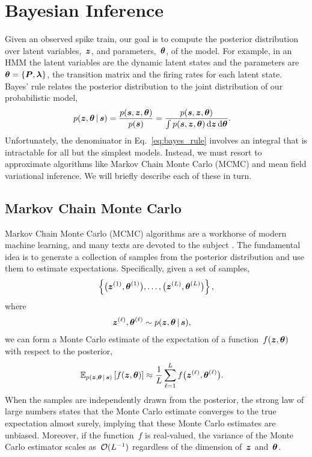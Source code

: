 
\section{Bayesian Inference}
\label{sec:inference_algorithms}
Given an observed spike train, our goal is to compute the posterior
distribution over latent variables,~$\boldsymbol{z}$, and parameters,~$\boldsymbol{\theta}$,
of the model.  For example, in an HMM the latent variables are 
the dynamic latent states and the parameters
are~${\boldsymbol{\theta} = \{\boldsymbol{P}, \boldsymbol{\lambda}\}}$, the transition matrix and the
firing rates for each latent state. Bayes' rule relates the posterior
distribution to the joint distribution of our probabilistic model,
\begin{align}
  \label{eq:bayes_rule}
  p(\boldsymbol{z}, \boldsymbol{\theta} \,|\, \boldsymbol{s}) 
  &= \frac{p(\boldsymbol{s}, \boldsymbol{z}, \boldsymbol{\theta})}{p(\boldsymbol{s})} 
   = \frac{p(\boldsymbol{s}, \boldsymbol{z}, \boldsymbol{\theta})}{\int p(\boldsymbol{s}, \boldsymbol{z}, \boldsymbol{\theta}) \, \mathrm{d}\boldsymbol{z} \, \mathrm{d}\boldsymbol{\theta}} .
\end{align}
Unfortunately, the denominator in Eq.~\ref{eq:bayes_rule} involves an 
integral that is intractable for 
all but the simplest models. Instead, we must resort to approximate 
algorithms like Markov Chain Monte Carlo (MCMC) and mean field variational 
inference. We will briefly describe each of these in turn.

\subsection{Markov Chain Monte Carlo}
Markov Chain Monte Carlo (MCMC) algorithms are a workhorse of modern
machine learning, and many texts are devoted to the subject
\citep[e.g.][]{geyer1992practical, gilks2005markov, robert2013monte}.
The fundamental idea is to generate a collection of samples from the
posterior distribution and use them to estimate expectations.
Specifically, given a set of samples,
\begin{align*}
  \left \{ \big(\boldsymbol{z}^{(1)}, \boldsymbol{\theta}^{(1)} \big), 
           \ldots, 
           \big(\boldsymbol{z}^{(L)}, \boldsymbol{\theta}^{(L)} \big) 
  \right\},
\end{align*}
where
\begin{align*}
  \boldsymbol{z}^{(\ell)}, \boldsymbol{\theta}^{(\ell)} &\sim p(\boldsymbol{z}, \boldsymbol{\theta} \,|\, \boldsymbol{s}),
\end{align*}
we can form a Monte Carlo estimate of the expectation of a function~$f(\boldsymbol{z}, \boldsymbol{\theta})$
with respect to the posterior,
\begin{align*}
  \mathbb{E}_{p(\boldsymbol{z}, \boldsymbol{\theta} \,|\, \boldsymbol{s})} \left[ f(\boldsymbol{z}, \boldsymbol{\theta}) \right] 
  &\approx \frac{1}{L} \sum_{\ell = 1}^L f \big(\boldsymbol{z}^{(\ell)}, \boldsymbol{\theta}^{(\ell)} \big).
\end{align*}
When the samples are independently drawn from the posterior, the strong 
law of large numbers states that the Monte Carlo estimate converges to 
the true expectation almost surely, implying that these Monte Carlo
estimates are unbiased. Moreover, if the function~$f$ is real-valued, 
the variance of the Monte Carlo estimator scales as~$\mathcal{O}(L^{-1})$
regardless of the dimension of~$\boldsymbol{z}$ and~$\boldsymbol{\theta}$.


